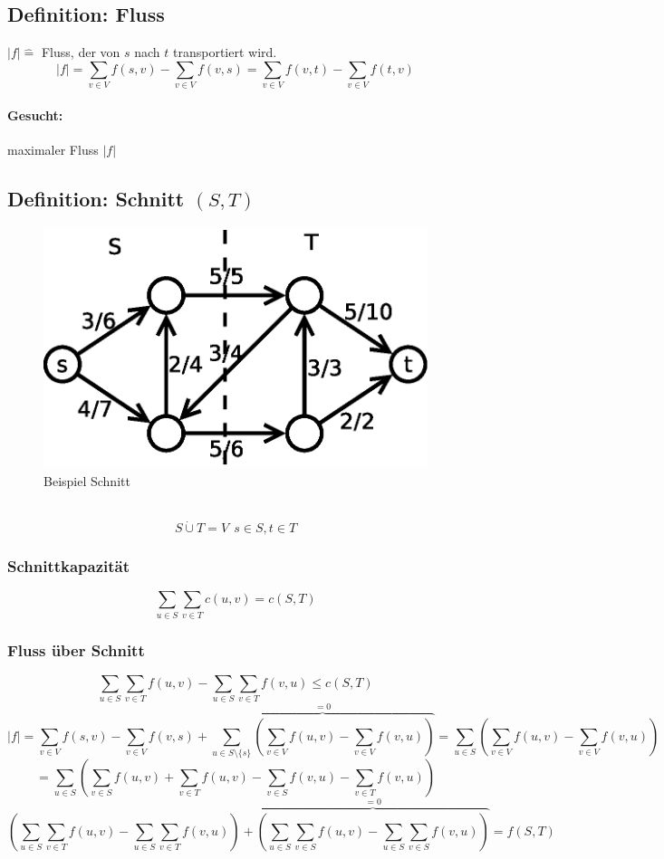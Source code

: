 \subsection{Definition: Fluss}
$|f| \hat{=}$ Fluss, der von $s$ nach $t$ transportiert wird.
\[ |f| = \sum_{v\in V} f(s,v) - \sum_{v\in V} f(v,s) = \sum_{v\in V} f(v,t) - \sum_{v\in V} f(t,v) \]
\paragraph{Gesucht:} maximaler Fluss $|f|$
\subsection{Definition: Schnitt $(S,T)$}
\begin{figure}
	\centering
	\includegraphics[width=\linewidth]{24/Grafik/Diagramm5}
	\caption{Beispiel Schnitt}
	\label{fig:Diagramm5}
\end{figure}
$ $
\[ S\dot{\cup} T = V~~ s\in S, t\in T \]
\subsubsection{Schnittkapazität}
\[ \sum_{u\in S}\sum_{v\in T} c(u,v) = c(S,T) \]
\subsubsection{Fluss über Schnitt}
\[ \sum_{u\in S}\sum_{v\in T} f(u,v) - \sum_{u\in S}\sum_{v\in T} f(v,u) \leq c(S,T) \]
\vspace{40pt}
\[ |f| = \sum_{v\in V} f(s,v) - \sum_{v \in V}f(v,s)+\overset{=0}{\overbrace{\sum_{u\in S\setminus\{ s \}} \left( \sum_{v\in V} f(u,v) - \sum_{v \in V} f(v,u) \right)   }} = \sum_{u \in S} \left(\sum_{v\in V}f(u,v)-\sum_{v \in V}f(v,u)   \right) \]
\[ =\sum_{u \in S}\left(  \sum_{v\in S} f(u,v)+\sum_{v\in T}f(u,v) - \sum_{v \in S}f(v,u)- \sum_{v\in T}f(v,u)  \right) \]
\[ \left( \sum_{u\in S}\sum_{v\in T} f(u,v) -\sum_{u\in S}\sum_{v\in T} f(v,u)  \right) + \overset{=0}{\overbrace{\left(  \sum_{u\in S}\sum_{v\in S}f(u,v) - \sum_{u\in S}\sum_{v\in S} f(v,u) \right)} } = f(S,T)\]
